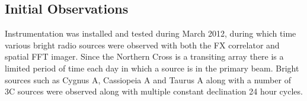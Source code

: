 \documentclass[useAMS,macros,usenatbib]{mn2e}
\begin{document}
%

\subsection{Initial Observations}
\label{observations}

Instrumentation was installed and tested during March 2012, during which time various bright radio sources were observed with both the FX correlator and spatial FFT imager.
Since the Northern Cross is a transiting array there is a limited period of time each day in which a source is in the primary beam.
Bright sources such as Cygnus A, Cassiopeia A and Taurus A along with a number of 3C sources were observed along with multiple constant declination 24 hour cycles.
\end{document}
